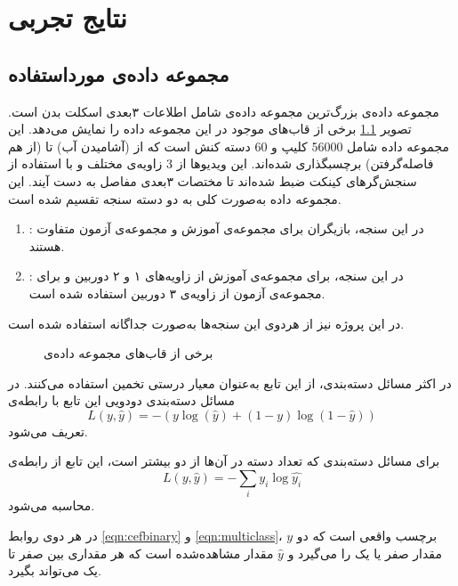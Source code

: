 \chapter{نتایج تجربی}
\section{مجموعه ‌داده‌ی مورداستفاده}


مجموعه ‌داده‌ی  بزرگ‌ترین مجموعه ‌داده‌ی شامل اطلاعات ۳بعدی اسکلت بدن است.\cite{st-gcn} تصویر \ref{fig:ntu} برخی از قاب‌های موجود در این مجموعه‌ داده را نمایش ‌می‌دهد. این مجموعه داده شامل 56000 کلیپ و 60 دسته کنش است که از  (آشامیدن آب) تا  (از هم فاصله‌گرفتن) برچسبگذاری شده‌اند. این ویدیوها از 3 زاویه‌ی مختلف و با استفاده از ‌سنجش‌گرهای کینکت  ضبط شده‌اند تا مختصات ۳بعدی مفاصل به دست آیند. این مجموعه داده به‌صورت کلی به دو دسته سنجه تقسیم شده است.\cite{NTU_paper}
\begin{enumerate}
\item {}: در این سنجه، بازیگران برای مجموعه‌ی آموزش  و مجموعه‌ی آزمون  متفاوت هستند. 
\item {}: در این سنجه، برای مجموعه‌ی آموزش از زاویه‌های ۱ و ۲ دوربین و برای مجموعه‌ی آزمون از زاویه‌ی ۳ دوربین استفاده شده است. 
\end{enumerate}
در این پروژه نیز از هردوی این سنجه‌ها به‌صورت جداگانه استفاده شده است.
\begin{figure}[ht]
\caption[برخی از قاب‌های مجموعه داده‌ی ]{برخی از قاب‌های مجموعه داده‌ی \cite{ntu_site}}
\label{fig:ntu}
\end{figure}


در اکثر مسائل دسته‌بندی، از این تابع به‌عنوان معیار درستی تخمین استفاده می‌کنند.\cite{entropy_src} \cite{st-gcn} در مسائل دسته‌بندی دودویی این تابع با رابطه‌ی 
\begin{equation}\label{eqn:cefbinary}
	L(y, \hat{y}) = - (y\log (\hat{y}) + (1 - y)\log (1 - \hat{y}))
\end{equation}
 تعریف می‌شود.\cite{entropy_src}

برای مسائل دسته‌بندی که تعداد دسته در آن‌ها از دو بیشتر است، این تابع از رابطه‌ی
\begin{equation} \label{eqn:multiclass}
	 L(y, \hat{y}) = - \sum_{i}y_i\log \hat{y_i}
\end{equation}
 محاسبه می‌شود.\cite{entropy_src}

در هر دوی روابط \ref{eqn:cefbinary} و \ref{eqn:multiclass}، $y$ برچسب واقعی است که دو مقدار صفر یا یک را می‌گیرد و $\hat{y}$ مقدار مشاهده‌شده است که هر مقداری بین صفر تا یک می‌تواند بگیرد. 